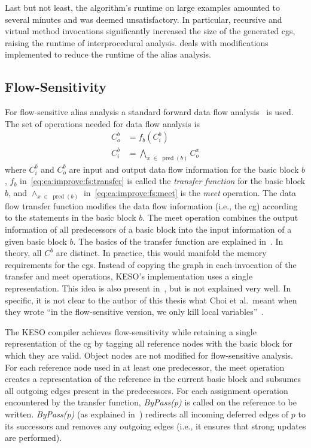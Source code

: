 		Last but not least, the algorithm's runtime on large examples amounted to several minutes and was deemed
		unsatisfactory. In particular, recursive and virtual method invocations significantly increased the size of the
		generated \glspl{cg}, raising the runtime of interprocedural analysis.  deals with
		modifications implemented to reduce the runtime of the alias analysis.

		\subsection{Flow-Sensitivity}
			\label{subsec:ea:improve:fs}
			For flow-sensitive alias analysis a standard forward data flow analysis~\cite[Sec.~9.2]{aho:07:compilers} is used.
			The set of operations needed for data flow analysis is
			\begin{align}
				C_o^b &= f_b\left( C_i^b \right)\label{eq:ea:improve:fs:transfer}\\
				C_i^b &= \bigwedge_{x \;\in\; \operatorname{pred}(b)} C_o^x\label{eq:ea:improve:fs:meet}
			\end{align}
			where $C_i^b$ and $C_o^b$ are input and output data flow information for the basic block $b$, $f_b$
			in~\cref{eq:ea:improve:fs:transfer} is called the \emph{transfer function} for the basic block $b$, and $\wedge_{x
			\;\in\; \operatorname{pred}(b)}$ in~\cref{eq:ea:improve:fs:meet} is the \emph{meet} operation. The data flow
			transfer function modifies the data flow information (i.e., the \acrlong{cg}) according to the statements in the
			basic block $b$. The meet operation combines the output information of all predecessors of a basic block into the
			input information of a given basic block $b$. The basics of the transfer function are explained in~\cite{lang:12,
			choi:03:toplas}. In theory, all $C^b$ are distinct. In practice, this would manifold the memory requirements for
			the \glspl{cg}. Instead of copying the graph in each invocation of the transfer and meet operations, KESO's
			implementation uses a single representation. This idea is also present in~\cite[Sec.~3]{choi:03:toplas}, but is
			not explained very well. In specific, it is not clear to the author of this thesis what Choi et al.\ meant when
			they wrote \enquote{in the flow-sensitive version, we only kill local variables}~\cite[p.~885]{choi:03:toplas}.

			The KESO compiler achieves flow-sensitivity while retaining a single representation of the \gls{cg} by tagging all
			reference nodes with the basic block for which they are valid. Object nodes are not modified for flow-sensitive
			analysis. For each reference node used in at least one predecessor, the meet operation creates a representation of
			the reference in the current basic block and subsumes all outgoing edges present in the predecessors. For each
			assignment operation encountered by the transfer function, \emph{ByPass(p)} is called on the reference to be
			written. \emph{ByPass(p)} (as explained in~\cite{choi:03:toplas}) redirects all incoming deferred edges of $p$ to
			its successors and removes any outgoing edges (i.e., it ensures that strong updates are performed).

